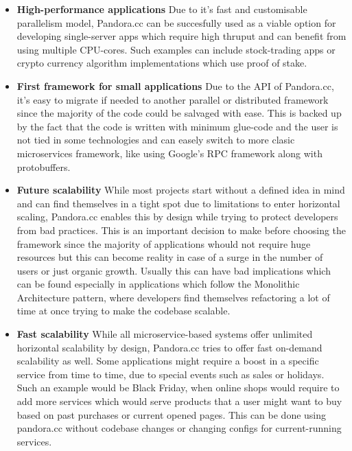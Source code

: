 \begin{itemize}
\item \textbf{High-performance applications} Due to it's fast and customisable parallelism model, Pandora.cc can be succesfully used as a viable option for developing single-server apps which require high thruput and can benefit from using multiple CPU-cores. Such examples can include stock-trading apps or crypto currency algorithm implementations which use proof of stake.

\item \textbf{First framework for small applications} Due to the API of Pandora.cc, it's easy to migrate if needed to another parallel or distributed framework since the majority of the code could be salvaged with ease. This is backed up by the fact that the code is written with minimum glue-code and the user is not tied in some technologies and can easely switch to more clasic microservices framework, like using Google's RPC framework along with protobuffers.

\item \textbf{Future scalability} While most projects start without a defined idea in mind and can find themselves in a tight spot due to limitations to enter horizontal scaling, Pandora.cc enables this by design while trying to protect developers from bad practices. This is an important decision to make before choosing the framework since the majority of applications whould not require huge resources but this can become reality in case of a surge in the number of users or just organic growth. Usually this can have bad implications which can be found especially in applications which follow the Monolithic Architecture pattern, where developers find themselves refactoring a lot of time at once trying to make the codebase scalable.

\item \textbf{Fast scalability} While all microservice-based systems offer unlimited horizontal scalability by design, Pandora.cc tries to offer fast on-demand scalability as well. Some applications might require a boost in a specific service from time to time, due to special events such as sales or holidays. Such an example would be Black Friday, when online shops would require to add more services which would serve products that a user might want to buy based on past purchases or current opened pages. This can be done using pandora.cc without codebase changes or changing configs for current-running services.
\end{itemize}
